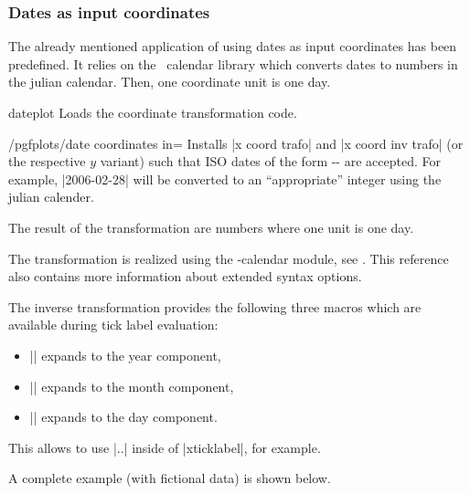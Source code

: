 \subsubsection{Dates as input coordinates}
The already mentioned application of using dates as input coordinates has been predefined. It relies on the \pgfname\ calendar library which converts dates to numbers in the julian calendar. Then, one coordinate unit is one day.

\begin{tikzlibrary}{dateplot}
	Loads the coordinate transformation code.
\end{tikzlibrary}

\begin{stylekey}{/pgfplots/date coordinates in=}
	Installs |x coord trafo| and |x coord inv trafo| (or the respective $y$ variant) such that ISO dates of the form -- are accepted. For example, |2006-02-28| will be converted to an ``appropriate'' integer using the julian calender.

	The result of the transformation are numbers where one unit is one day.

	The transformation is realized using the \pgfname-calendar module, see \cite[Calendar Library]{tikz}. This reference also contains more information about extended syntax options.

	The inverse transformation provides the following three macros which are available during tick label evaluation:
	\begin{itemize}
		\item |\year| expands to the year component,
		\item |\month| expands to the month component,
		\item |\day| expands to the day component.
	\end{itemize}
	This allows to use |\day.\month.\year| inside of |xticklabel|, for example.

	A complete example (with fictional data) is shown below.
\begin{codeexample}[]


\end{codeexample}
\end{stylekey}

